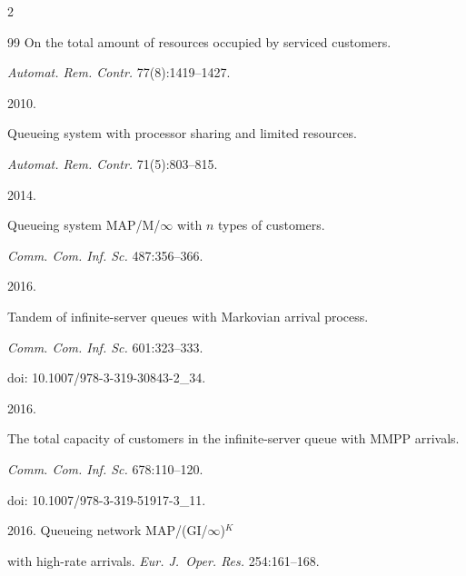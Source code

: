 \begin{multicols}{2}
{{\begin{thebibliography}{99}
On the total amount of resources occupied by serviced customers. 


\textit{Automat. Rem. Contr.} 77(8):1419--1427.













 2010. 


Queueing system with processor sharing and limited resources. 


\textit{Automat. Rem. Contr.} 71(5):803--815.







 2014. 


Queueing system MAP/M/$\infty$ with $n$ types of customers. 


\textit{Comm. Com. Inf. Sc.} 487:356--366.







 2016. 


Tandem of infinite-server queues with Markovian arrival process. 


\textit{Comm. Com. Inf. Sc.} 601:323--333. 


doi: 10.1007/978-3-319-30843-2\_34.







  2016. 


The total capacity of customers in the infinite-server queue with MMPP arrivals. 


\textit{Comm. Com. Inf. Sc.} 678:110--120. 


doi: 10.1007/978-3-319-51917-3\_11.


    










 2016. Queueing network MAP/(GI/$\infty$)$^K$ 


with high-rate arrivals. \textit{Eur. J.~Oper. Res.} 254:161--168. 



\end{thebibliography}}}
\end{multicols}
